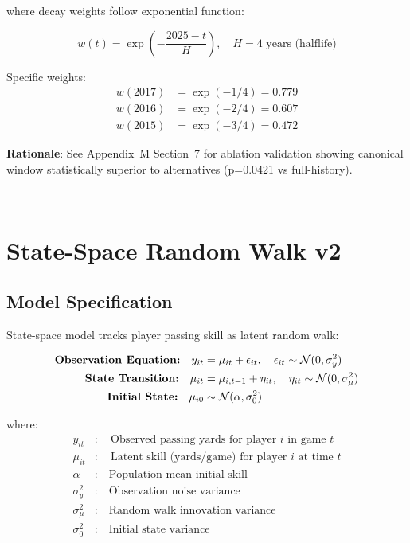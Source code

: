 where decay weights follow exponential function:

\begin{equation}
w(t) = \exp\left(-\frac{2025 - t}{H}\right), \quad H = 4 \text{ years (halflife)}
\label{eq:decay-function}
\end{equation}

Specific weights:
\begin{align}
w(2017) &= \exp(-1/4) = 0.779 \\
w(2016) &= \exp(-2/4) = 0.607 \\
w(2015) &= \exp(-3/4) = 0.472
\end{align}

\textbf{Rationale}: See Appendix~M Section~7 for ablation validation showing canonical window statistically superior to alternatives (p=0.0421 vs full-history).

---

\section{State-Space Random Walk v2}
\label{sec:state-space-v2-spec}

\subsection{Model Specification}

State-space model tracks player passing skill as latent random walk:

\begin{align}
\text{\textbf{Observation Equation:}} \quad y_{it} &= \mu_{it} + \epsilon_{it}, \quad \epsilon_{it} \sim \mathcal{N}(0, \sigma_y^2) \\
\text{\textbf{State Transition:}} \quad \mu_{it} &= \mu_{i,t-1} + \eta_{it}, \quad \eta_{it} \sim \mathcal{N}(0, \sigma_\mu^2) \\
\text{\textbf{Initial State:}} \quad \mu_{i0} &\sim \mathcal{N}(\alpha, \sigma_0^2)
\label{eq:state-space-spec}
\end{align}

where:
\begin{align}
y_{it} &: \quad \text{Observed passing yards for player } i \text{ in game } t \\
\mu_{it} &: \quad \text{Latent skill (yards/game) for player } i \text{ at time } t \\
\alpha &: \quad \text{Population mean initial skill} \\
\sigma_y^2 &: \quad \text{Observation noise variance} \\
\sigma_\mu^2 &: \quad \text{Random walk innovation variance} \\
\sigma_0^2 &: \quad \text{Initial state variance}
\end{align}

